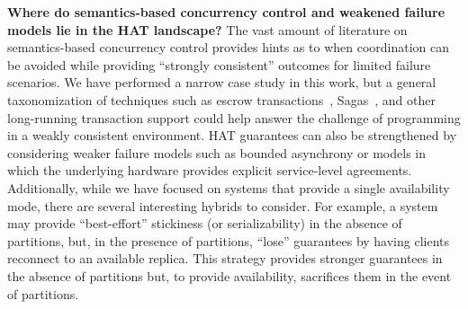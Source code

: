 \textbf{Where do semantics-based concurrency control and weakened
  failure models lie in the HAT landscape?} The vast amount of
literature on semantics-based concurrency control provides hints as to
when coordination can be avoided while providing ``strongly
consistent'' outcomes for limited failure scenarios. We have performed
a narrow case study in this work, but a general taxonomization of
techniques such as escrow transactions~\cite{escrow},
Sagas~\cite{sagas}, and other long-running transaction support could
help answer the challenge of programming in a weakly consistent
environment. HAT guarantees can also be strengthened by considering
weaker failure models such as bounded asynchrony or models in which
the underlying hardware provides explicit service-level
agreements. Additionally, while we have focused on systems that
provide a single availability mode, there are several interesting
hybrids to consider. For example, a system may provide ``best-effort''
stickiness (or serializability) in the absence of partitions, but, in
the presence of partitions, ``lose'' guarantees by having clients
reconnect to an available replica. This strategy provides stronger
guarantees in the absence of partitions but, to provide availability,
sacrifices them in the event of partitions.
